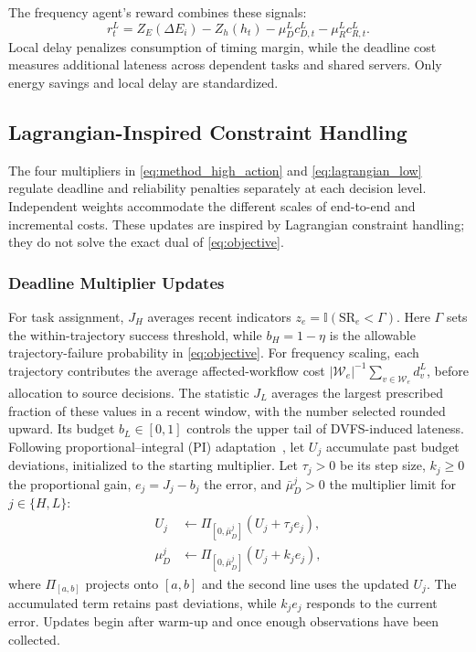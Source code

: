\documentclass[journal]{IEEEtran}
\newcommand{\ind}{\mathbb{I}}
\begin{document}
The frequency agent's reward combines these signals:
\begin{equation}
    r_t^L=Z_E(\Delta E_i)-Z_h(h_t)
        -\mu_D^L c_{D,t}^L-\mu_R^L c_{R,t}^L.
    \label{eq:lagrangian_low}
\end{equation}
Local delay penalizes consumption of timing margin, while the deadline cost measures additional lateness across dependent tasks and shared servers. Only energy savings and local delay are standardized.

\subsection{Lagrangian-Inspired Constraint Handling}
\label{subsec:lagrangian}
The four multipliers in \eqref{eq:method_high_action} and \eqref{eq:lagrangian_low} regulate deadline and reliability penalties separately at each decision level. Independent weights accommodate the different scales of end-to-end and incremental costs. These updates are inspired by Lagrangian constraint handling; they do not solve the exact dual of \eqref{eq:objective}.

\subsubsection{Deadline Multiplier Updates}
For task assignment, $J_H$ averages recent indicators $z_e=\ind(\mathrm{SR}_e<\Gamma)$. Here $\Gamma$ sets the within-trajectory success threshold, while $b_H=1-\eta$ is the allowable trajectory-failure probability in \eqref{eq:objective}. For frequency scaling, each trajectory contributes the average affected-workflow cost $|\mathcal W_e|^{-1}\sum_{v\in\mathcal W_e}d_v^L$, before allocation to source decisions. The statistic $J_L$ averages the largest prescribed fraction of these values in a recent window, with the number selected rounded upward. Its budget $b_L\in[0,1]$ controls the upper tail of DVFS-induced lateness. Following proportional--integral (PI) adaptation~\cite{stooke2020}, let $U_j$ accumulate past budget deviations, initialized to the starting multiplier. Let $\tau_j>0$ be its step size, $k_j\geq0$ the proportional gain, $e_j=J_j-b_j$ the error, and $\bar\mu_D^j>0$ the multiplier limit for $j\in\{H,L\}$:
\begin{equation*}
\begin{aligned}
    U_j&\leftarrow
        \Pi_{[0,\bar\mu_D^j]}(U_j+\tau_j e_j),\\
    \mu_D^j&\leftarrow
        \Pi_{[0,\bar\mu_D^j]}(U_j+k_j e_j),
\end{aligned}
\end{equation*}
where $\Pi_{[a,b]}$ projects onto $[a,b]$ and the second line uses the updated $U_j$. The accumulated term retains past deviations, while $k_j e_j$ responds to the current error. Updates begin after warm-up and once enough observations have been collected.
\end{document}
